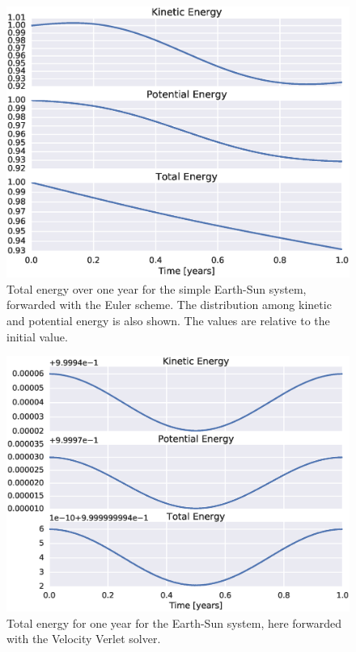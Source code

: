 \documentclass[aps,reprint]{revtex4-1}
\begin{document}
\begin{figure}[H]
  \includegraphics[width=\columnwidth]{figures/energy_euler.eps}
  \caption{Total energy over one year for the simple Earth-Sun system,
  forwarded with the Euler scheme. The distribution among kinetic and potential
  energy is also shown. The values are relative to the initial value.}
  \label{fig:eulerenergy}
\end{figure}

\begin{figure}[H]
  \includegraphics[width=\columnwidth]{figures/energy_verlet.eps}
  \caption{Total energy for one year for the Earth-Sun system, here forwarded
  with the Velocity Verlet solver.}
  \label{fig:verletenergy}
\end{figure}
\end{document}
